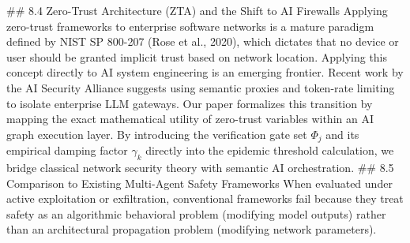 ## 8.4 Zero-Trust Architecture (ZTA) and the Shift to AI Firewalls
Applying zero-trust frameworks to enterprise software networks is a mature paradigm defined by NIST SP 800-207 (Rose et al., 2020), which dictates that no device or user should be granted implicit trust based on network location. Applying this concept directly to AI system engineering is an emerging frontier. Recent work by the AI Security Alliance suggests using semantic proxies and token-rate limiting to isolate enterprise LLM gateways. Our paper formalizes this transition by mapping the exact mathematical utility of zero-trust variables within an AI graph execution layer. By introducing the verification gate set $\Phi_j$ and its empirical damping factor $\gamma_k$ directly into the epidemic threshold calculation, we bridge classical network security theory with semantic AI orchestration.
## 8.5 Comparison to Existing Multi-Agent Safety Frameworks
When evaluated under active exploitation or exfiltration, conventional frameworks fail because they treat safety as an algorithmic behavioral problem (modifying model outputs) rather than an architectural propagation problem (modifying network parameters).

